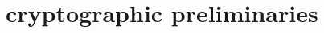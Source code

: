 \section{cryptographic preliminaries}
\begin{comment}
\subsection{Commitment scheme} \label{app:DefCommitment}
\begin{definition}\label{defn:commscheme}
 A pair of $\ppt$ algorithms $(\gen,\com)$ constitute a non-interactive commitment scheme if $\sigma\sample \gen(\secparam)$ consists of description of sets $\calM_\sigma$ (message space), $\calR_\sigma$ (randomness space), $\calC_\sigma$ (commitment space) and an efficiently computable function $\com_\sigma: \calM_\sigma\times \calR_\sigma\rightarrow \calC_\sigma$ which is {\em hiding} and {\em binding} as defined later.
\end{definition}

For $x\in \calM_\sigma$, we generate a {\em commitment} of $x$ as $\com_\sigma(x,r)$ where $r\sample \calR_\sigma$ is drawn uniformly at random. For ease of notation, we simply use $\com$ instead of $\com_\sigma$ and use $\com(x)$ to denote the random variable corresponding to commitment of $x$. 

\begin{definition}[Hiding Commitment]\label{defn:hidingcomm}
A commitment scheme $(\gen,\com)$ is called perfectly {\em hiding}  if for all adversaries $\adv$, the following probability is  $1/2$:
{\small
\begin{align*}
\condprob{b=b'}{
\begin{array}{l}
\sigma\gets \gen(\secparam); \\
(x_0,x_1)\in \calM^2_p\gets \adv(\sigma); \\
b\sample \bitset; c\gets \com(x_b);\\
b'\gets \adv(\secparam,\sigma,c)
\end{array}
}
\end{align*}
}
\end{definition}

\begin{definition}[Binding Commitment]\label{defn:bindingcomm}
A commitment scheme $(\gen,\com)$ is called {\em binding} if for all $\ppt$  $\adv$, 
{\small
\begin{align*}
\condprob{
	\begin{array}{c}
	\com_\sigma(x_0,r_0)=\com_\sigma(x_1,r_1)\\
	\wedge x_0\neq x_1
\end{array}}{
\begin{array}{l}
\sigma \gets \gen(\secparam) \\
x_0,x_1,r_0,r_1 \gets \adv(\secparam,\sigma)
\end{array}
}\\
 < \negl(\lambda)
\end{align*}
}

\end{definition}
\end{comment}
